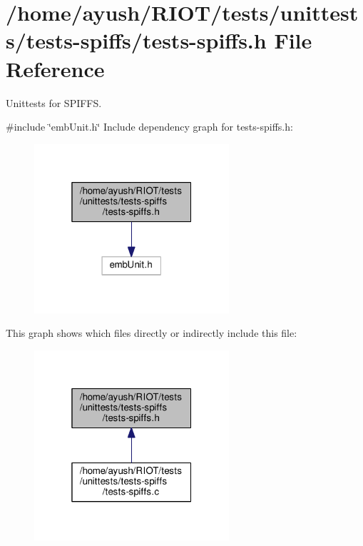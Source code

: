 \hypertarget{tests-spiffs_8h}{}\section{/home/ayush/\+R\+I\+O\+T/tests/unittests/tests-\/spiffs/tests-\/spiffs.h File Reference}
\label{tests-spiffs_8h}


Unittests for S\+P\+I\+F\+FS.  


{\ttfamily \#include \char`\"{}emb\+Unit.\+h\char`\"{}}\newline
Include dependency graph for tests-\/spiffs.h\+:
\nopagebreak
\begin{figure}[H]
\begin{center}
\leavevmode
\includegraphics[width=205pt]{tests-spiffs_8h__incl}
\end{center}
\end{figure}
This graph shows which files directly or indirectly include this file\+:
\nopagebreak
\begin{figure}[H]
\begin{center}
\leavevmode
\includegraphics[width=205pt]{tests-spiffs_8h__dep__incl}
\end{center}
\end{figure}
